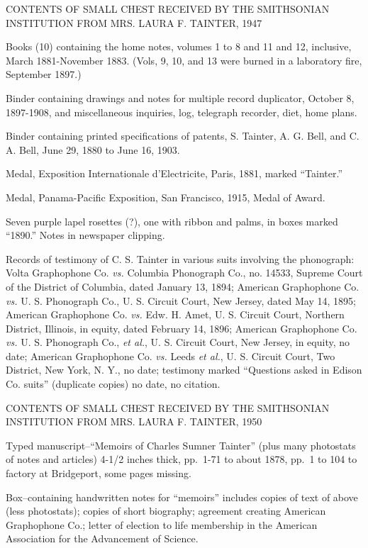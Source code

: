 \documentclass[12pt,oneside]{scrbook}
\begin{document}
  CONTENTS OF SMALL CHEST RECEIVED BY THE SMITHSONIAN INSTITUTION FROM
  MRS. LAURA F. TAINTER, 1947
  
  Books (10) containing the home notes, volumes 1 to 8 and 11 and 12,
  inclusive, March 1881-November 1883. (Vols, 9, 10, and 13 were burned in
  a laboratory fire, September 1897.)
  
  Binder containing drawings and notes for multiple record duplicator,
  October 8, 1897-1908, and miscellaneous inquiries, log, telegraph
  recorder, diet, home plans.
  
  Binder containing printed specifications of patents, S. Tainter, A. G.
  Bell, and C. A. Bell, June 29, 1880 to June 16, 1903.
  
  Medal, Exposition Internationale d'Electricite, Paris, 1881, marked
  ``Tainter.''
  
  Medal, Panama-Pacific Exposition, San Francisco, 1915, Medal of Award.
  
  Seven purple lapel rosettes (?), one with ribbon and palms, in boxes
  marked ``1890.'' Notes in newspaper clipping.
  
  Records of testimony of C. S. Tainter in various suits involving the
  phonograph: Volta Graphophone Co. \emph{vs.} Columbia Phonograph Co.,
  no. 14533, Supreme Court of the District of Columbia, dated January 13,
  1894; American Graphophone Co. \emph{vs.} U. S. Phonograph Co., U. S.
  Circuit Court, New Jersey, dated May 14, 1895; American Graphophone Co.
  \emph{vs.} Edw. H. Amet, U. S. Circuit Court, Northern District,
  Illinois, in equity, dated February 14, 1896; American Graphophone Co.
  \emph{vs.} U. S. Phonograph Co., \emph{et al.}, U. S. Circuit Court, New
  Jersey, in equity, no date; American Graphophone Co. \emph{vs.} Leeds
  \emph{et al.}, U. S. Circuit Court, Two District, New York, N. Y., no
  date; testimony marked ``Questions asked in Edison Co. suits''
  (duplicate copies) no date, no citation.
  
  CONTENTS OF SMALL CHEST RECEIVED BY THE SMITHSONIAN INSTITUTION FROM
  MRS. LAURA F. TAINTER, 1950
  
  Typed manuscript--``Memoirs of Charles Sumner Tainter'' (plus many
  photostats of notes and articles) 4-1/2 inches thick, pp.~1-71 to about
  1878, pp.~1 to 104 to factory at Bridgeport, some pages missing.
  
  Box--containing handwritten notes for ``memoirs'' includes copies of
  text of above (less photostats); copies of short biography; agreement
  creating American Graphophone Co.; letter of election to life membership
  in the American Association for the Advancement of Science.
  
\end{document}
